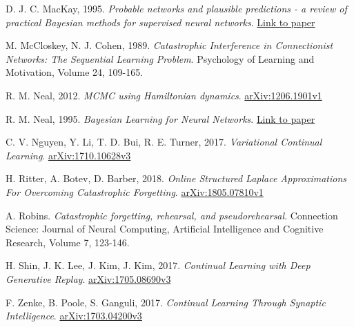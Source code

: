 \documentclass[a4paper,11=0pt]{article}
\begin{document}
\begin{thebibliography}{8}

 D. J. C. MacKay, 1995. \textit{Probable networks and plausible predictions - a review of practical Bayesian methods for supervised neural networks}. \href{https://citeseerx.ist.psu.edu/viewdoc/download;jsessionid=F4F7C99DECF23AEDF5BAAF5E25DE86F9?doi=10.1.1.136.4011&rep=rep1&type=pdf}{Link to paper}

 M. McCloskey, N. J. Cohen, 1989. \textit{Catastrophic Interference in Connectionist Networks: The Sequential Learning Problem}. Psychology of Learning and Motivation, Volume 24, 109-165.

 R. M. Neal, 2012. \textit{MCMC using Hamiltonian dynamics}. \href{https://arxiv.org/abs/1206.1901}{arXiv:1206.1901v1}

 R. M. Neal, 1995. \textit{Bayesian Learning for Neural Networks}. \href{http://citeseerx.ist.psu.edu/viewdoc/download?doi=10.1.1.446.9306&rep=rep1&type=pdf}{Link to paper}

 C. V. Nguyen, Y. Li, T. D. Bui, R. E. Turner, 2017. \textit{Variational Continual Learning}. \href{https://arxiv.org/abs/1710.10628}{arXiv:1710.10628v3}


 H. Ritter, A. Botev, D. Barber, 2018. \textit{Online Structured Laplace Approximations For Overcoming Catastrophic Forgetting}. \href{https://arxiv.org/abs/1805.07810}{arXiv:1805.07810v1}

 A. Robins. \textit{Catastrophic forgetting, rehearsal, and pseudorehearsal}. Connection Science: Journal of Neural Computing, Artificial Intelligence and Cognitive Research, Volume 7, 123-146.

 H. Shin, J. K. Lee, J. Kim, J. Kim, 2017. \textit{Continual Learning with Deep Generative Replay}. \href{https://arxiv.org/abs/1705.08690}{arXiv:1705.08690v3}

 F. Zenke, B. Poole, S. Ganguli, 2017. \textit{Continual Learning Through Synaptic Intelligence}. \href{https://arxiv.org/abs/1703.04200}{arXiv:1703.04200v3}




\end{thebibliography}
\end{document}
